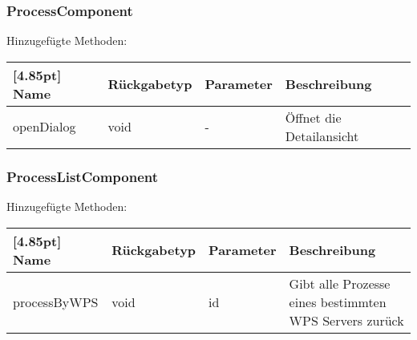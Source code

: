     	 \subsubsection{ProcessComponent}
			Hinzugefügte Methoden:
			\begin{center}
    			\setlength\tabcolsep{5pt}
    			\renewcommand{\arraystretch}{1.5}
    			\begin{tabularx}{\textwidth}{|l|l|l|X|}
    				\hline
    				\rowcolor[gray]{0.90}[4.85pt]
    				Name & Rückgabetyp & Parameter & Beschreibung \\ \hline
    				openDialog & void & - & Öffnet die Detailansicht \\ \hline
    			\end{tabularx}
		    \end{center}
		    

    	 \subsubsection{ProcessListComponent}
			Hinzugefügte Methoden:
			\begin{center}
    			\setlength\tabcolsep{5pt}
    			\renewcommand{\arraystretch}{1.5}
    			\begin{tabularx}{\textwidth}{|l|l|l|X|}
    				\hline
    				\rowcolor[gray]{0.90}[4.85pt]
    				Name & Rückgabetyp & Parameter & Beschreibung \\ \hline
    				processByWPS & void & id & Gibt alle Prozesse eines bestimmten WPS Servers zurück \\ \hline
    			 \hline
    			\end{tabularx}
		    \end{center}
		    
